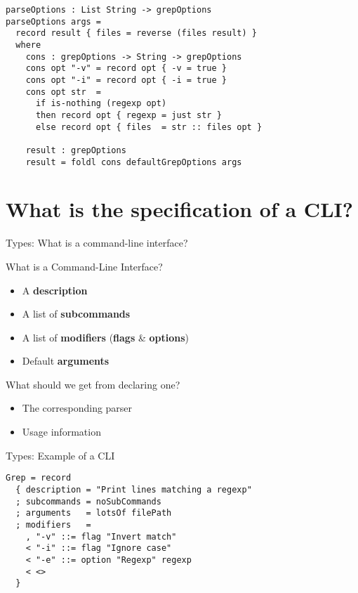 \documentclass[dvipsnames]{beamer}
\begin{document}
\begin{frame}[fragile]
\begin{verbatim}
parseOptions : List String -> grepOptions
parseOptions args =
  record result { files = reverse (files result) }
  where
    cons : grepOptions -> String -> grepOptions
    cons opt "-v" = record opt { -v = true }
    cons opt "-i" = record opt { -i = true }
    cons opt str  =
      if is-nothing (regexp opt)
      then record opt { regexp = just str }
      else record opt { files  = str :: files opt }

    result : grepOptions
    result = foldl cons defaultGrepOptions args
\end{verbatim}
\end{frame}

\section{What is the specification of a CLI?}
\begin{frame}{Types: What is a command-line interface?}

What is a Command-Line Interface?
  \begin{itemize}
    \item A \textbf{description}
    \item A list of \textbf{subcommands}
    \item A list of \textbf{modifiers} (\textbf{flags} \& \textbf{options})
    \item Default \textbf{arguments}
  \end{itemize}

What should we get from declaring one?
  \begin{itemize}
    \item The corresponding parser
    \item Usage information
  \end{itemize}
\end{frame}

\begin{frame}[fragile]{Types: Example of a CLI}
\begin{verbatim}
Grep = record
  { description = "Print lines matching a regexp"
  ; subcommands = noSubCommands
  ; arguments   = lotsOf filePath
  ; modifiers   = 
    , "-v" ::= flag "Invert match"
    < "-i" ::= flag "Ignore case"
    < "-e" ::= option "Regexp" regexp
    < <>
  }
\end{verbatim}
\end{frame}
\end{document}
